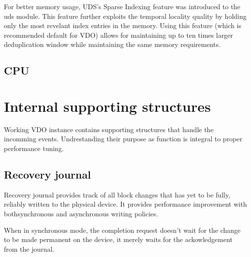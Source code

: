 \documentclass[
  color, %
  table, %
  lof,   %
  lot,   %
]{fithesis3}
\begin{document}
For better memory usage, UDS's Sparse Indexing feature was introduced to the uds module. This feature further exploits the temporal locality quality by holding only the most revelant index entries in the memory. Using this feature (which is recommended default for VDO) allows for maintaining up to ten times larger deduplication window while maintaining the same memory requirements.





\subsection{CPU}

\section{Internal supporting structures}
Working VDO instance contains supporting structures that handle the incomming events. Undrestanding their purpose as function is integral to proper performance tuning.


\subsection{Recovery journal}
Recovery journal provides track of all block changes that has yet to be fully, reliably written to the physical device. It provides performance improvement with bothsynchronous and asynchronous writing policies.

When in synchronous mode, the completion request doesn't wait for the change to be made permanent on the device, it merely waits for the ackowledgement from the journal.
\end{document}

